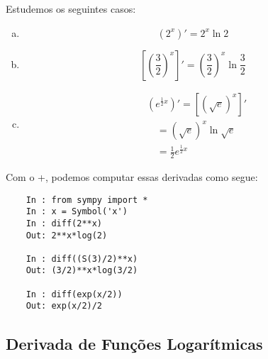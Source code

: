 \begin{ex}
  Estudemos os seguintes casos:
  \begin{enumerate}[a)]
  \item
    \begin{equation}
      \displaystyle\left(2^x\right)' = 2^x\ln 2
    \end{equation}
  \item
    \begin{equation}
      \displaystyle\left[\left(\frac{3}{2}\right)^x\right]' = \left(\frac{3}{2}\right)^x\ln\frac{3}{2}
    \end{equation}
  \item
    \begin{align}
      & \displaystyle\left(e^{\frac{1}{2}x}\right)' = \left[(\sqrt{e})^x\right]' \\
      & \text{}\quad = (\sqrt{e})^x\ln \sqrt{e}\\
      & \text{}\quad = \frac{1}{2}e^{\frac{1}{2}x}
    \end{align}
  \end{enumerate}
  \ifispython
  Com o {\python}+{\sympy}, podemos computar essas derivadas como segue:
  \begin{lstlisting}
    In : from sympy import *
    In : x = Symbol('x')
    In : diff(2**x)
    Out: 2**x*log(2)

    In : diff((S(3)/2)**x)
    Out: (3/2)**x*log(3/2)

    In : diff(exp(x/2))
    Out: exp(x/2)/2
  \end{lstlisting}
  \fi
\end{ex}

\subsection{Derivada de Funções Logarítmicas}\label{cap_deriv_sec_funexplog:ssec:dlog}

